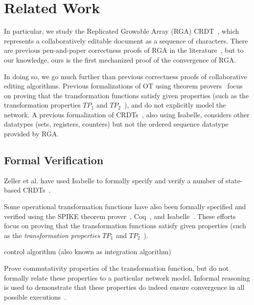 \section{Related Work}
\label{sect.relatedwork}

In particular, we study the Replicated Growable Array (RGA) CRDT~\cite{Roh:2011dw}, which represents
a collaboratively editable document as a sequence of characters. There are previous pen-and-paper
correctness proofs of RGA in the literature~\cite{Attiya:2016kh,Kleppmann:2016ve,Roh:2009ws}, but to
our knowledge, ours is the first mechanized proof of the convergence of RGA.

In doing so, we go much further than previous correctness proofs of collaborative editing
algorithms. Previous formalizations of OT using theorem
provers~\cite{Imine:2003ks,Imine:2006kn,Sinchuk:2016cf,Jungnickel:2015ua} focus on proving that the
transformation functions satisfy given properties (such as the transformation properties
$\mathit{TP}_1$ and $\mathit{TP}_2$~\cite{Oster:2006tr,Ressel:1996wx}), and do not explicitly model
the network. A previous formalization of CRDTs~\cite{Zeller:2014fl}, also using Isabelle, considers
other datatypes (sets, registers, counters) but not the ordered sequence datatype provided by RGA.


\subsection{Formal Verification}

Zeller et al. have used Isabelle to formally specify and verify a number of state-based CRDTs~\cite{Zeller:2014fl}.

Some operational transformation functions have also been formally specified and verified using the
SPIKE theorem prover~\cite{Imine:2003ks,Imine:2006kn}, Coq~\cite{Sinchuk:2016cf}, and
Isabelle~\cite{Jungnickel:2015ua}. These efforts focus on proving that the transformation functions
satisfy given properties (such as the \emph{transformation properties} $\mathit{TP}_1$ and
$\mathit{TP}_2$~\cite{Oster:2006tr,Ressel:1996wx}).

control algorithm (also known as integration algorithm)

Prove commutativity properties of the transformation function, but do not formally relate these
properties to a particular network model. Informal reasoning is used to demonstrate that these
properties do indeed ensure convergence in all possible
executions~\cite{Suleiman:1998eu,Sun:1998vf}.


